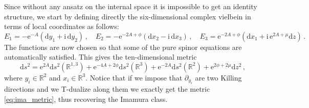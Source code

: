 \documentclass[12pt]{article}
\newcommand{\R}{\mathbb{R}}
\newcommand{\dd}{\mathrm{d}}
\newcommand{\e}{\mathrm{e}}
\newcommand{\ii}{\mathrm{i}}
\begin{document}
Since without any ansatz on the internal space it is impossible to get an identity structure, we start by defining directly the six-dimensional complex vielbein in terms of local coordinates as follows:
\begin{equation}
E_1 = -\e^{-A} (\dd y_1 + \ii \, \dd y_2 ) \, , \quad E_2 = -\e^{-2A+ \phi} (\dd x_2 - \ii \, \dd x_3 ) \, , \quad  E_3 = \e^{-2A+ \phi} (\dd x_1 + \ii \, \e^{2A+ \mu} \dd z ) \, .
\end{equation}
The functions are now chosen so that some of the pure spinor equations are automatically satisfied.
This gives the ten-dimensional metric
\begin{equation}
\label{eq:metIIA_noS2}
\dd s^2 = \e^{2A}\dd s^2 (\R^{1,3}) + \e^{-4A + 2 \phi}  \dd s^2(\R^3)+ \e^{-2A} \dd s^2(\R^2) + \e^{2 \phi + 2 \mu} \dd z^2 \, ,
\end{equation}
where $y_i \in \R^2$ and $x_i \in \R^3$. Notice that if we impose that $\partial_{y_i}$ are two Killing directions and we T-dualize along them we exactly get the metric \eqref{eq:ima_metric}, thus recovering the Imamura class.
\end{document}
